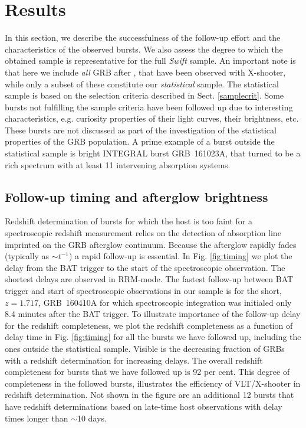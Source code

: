 \documentclass{aa}    %
\begin{document}
\section{Results} \label{results}

In this section, we describe the successfulness of the follow-up effort and the
characteristics of the observed bursts. We also assess the degree to which the
obtained sample is representative for the full \textit{Swift} sample. An
important note is that here we include \textit{all} GRB after \startdate, that
have been observed with X-shooter, while only a subset of these constitute our
\textit{statistical} sample. The statistical sample is based on the selection
criteria described in Sect. \ref{samplecrit}. Some bursts not fulfilling the
sample criteria have been followed up due to interesting characteristics, e.g.
curiosity properties of their light curves, their brightness, etc. These bursts
are not discussed as part of the investigation of the statistical properties of
the GRB population. A prime example of a burst outside the statistical sample is
bright INTEGRAL burst GRB~161023A, that turned to be a rich spectrum with at
least 11 intervening absorption systems.


\subsection{Follow-up timing and afterglow brightness} \label{timing}

Redshift determination of bursts for which the host is too faint for a
spectroscopic redshift measurement relies on the detection of absorption line
imprinted on the GRB afterglow continuum. Because the afterglow rapidly fades
(typically as $\sim t^{-1}$) a rapid follow-up is essential. In Fig.
\ref{fig:timing} we plot the delay from the BAT trigger to the start of the
spectroscopic observation. The shortest delays are observed in RRM-mode. The
fastest follow-up between BAT trigger and start of spectroscopic observations in
our sample is for the short, $z = 1.717$, GRB~160410A for which spectroscopic
integration was initialed only 8.4 minutes after the BAT trigger. To illustrate
importance of the follow-up delay for the redshift completeness, we plot the
redshift completeness as a function of delay time in Fig. \ref{fig:timing} for
all the bursts we have followed up, including the ones outside the statistical
sample. Visible is the decreasing fraction of GRBs with a redshift determination
for increasing delays. The overall redshift completeness for bursts that we have
followed up is 92 per cent. This degree of completeness in the followed bursts,
illustrates the efficiency of VLT/X-shooter in redshift determination. Not shown
in the figure are an additional 12 bursts that have redshift determinations
based on late-time host observations with delay times longer than $\sim$10 days.
\end{document}
